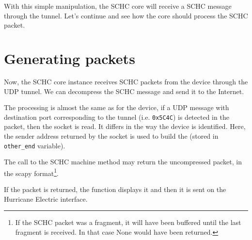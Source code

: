 With this simple manipulation, the SCHC core will receive a SCHC message through the tunnel. Let's continue and see how the core should process the SCHC packet.

\section{Generating packets}

Now, the SCHC core instance receives SCHC packets from the device through the UDP tunnel.
We can decompress the SCHC message and send it to the Internet.


The processing is almost the same as for the device, if a UDP message with destination port corresponding to the tunnel (i.e. \texttt{0x5C4C}) is detected in the packet, then the socket is read. It differs in the way the device is identified. Here, the sender address returned by the socket is used to build the  (stored in \texttt{other\_end} variable). 

The call to the SCHC machine  method may return the uncompressed packet, in the scapy format\footnote{If the SCHC packet was a fragment, it will have been buffered until the last fragment is received. 
In that case None would have been returned.}. 

If the packet is returned, the  function displays it and then it is sent on the Hurricane Electric interface.

